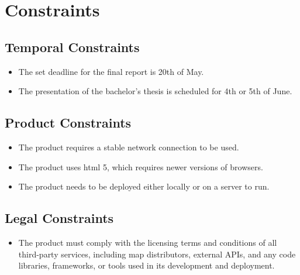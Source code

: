 \begin{itemize}

\end{itemize}

\section{Constraints}

\subsection{Temporal Constraints}

\begin{itemize}
    \item The set deadline for the final report is 20th of May.
    \item The presentation of the bachelor's thesis is scheduled for 4th or 5th of June.
\end{itemize}

\subsection{Product Constraints}

\begin{itemize}
    \item The product requires a stable network connection to be used.
    \item The product uses \acrshort{html} 5, which requires newer versions of browsers.
    \item The product needs to be deployed either locally or on a server to run.
\end{itemize}

\subsection{Legal Constraints}
\begin{itemize}
    \item The product must comply with the licensing terms and conditions of all third-party services, including map distributors, external APIs, and any code libraries, frameworks, or tools used in its development and deployment.
\end{itemize}

